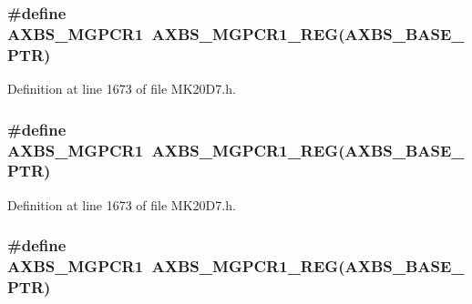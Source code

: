 \subsubsection[{\texorpdfstring{A\+X\+B\+S\+\_\+\+M\+G\+P\+C\+R1}{AXBS_MGPCR1}}]{\setlength{\rightskip}{0pt plus 5cm}\#define A\+X\+B\+S\+\_\+\+M\+G\+P\+C\+R1~{\bf A\+X\+B\+S\+\_\+\+M\+G\+P\+C\+R1\+\_\+\+R\+EG}({\bf A\+X\+B\+S\+\_\+\+B\+A\+S\+E\+\_\+\+P\+TR})}\hypertarget{group___a_x_b_s___register___accessor___macros_ga97c9483a4ad8f53f0c2b52e2e10fcd50}{}\label{group___a_x_b_s___register___accessor___macros_ga97c9483a4ad8f53f0c2b52e2e10fcd50}


Definition at line 1673 of file M\+K20\+D7.\+h.

\subsubsection[{\texorpdfstring{A\+X\+B\+S\+\_\+\+M\+G\+P\+C\+R1}{AXBS_MGPCR1}}]{\setlength{\rightskip}{0pt plus 5cm}\#define A\+X\+B\+S\+\_\+\+M\+G\+P\+C\+R1~{\bf A\+X\+B\+S\+\_\+\+M\+G\+P\+C\+R1\+\_\+\+R\+EG}({\bf A\+X\+B\+S\+\_\+\+B\+A\+S\+E\+\_\+\+P\+TR})}\hypertarget{group___a_x_b_s___register___accessor___macros_ga97c9483a4ad8f53f0c2b52e2e10fcd50}{}\label{group___a_x_b_s___register___accessor___macros_ga97c9483a4ad8f53f0c2b52e2e10fcd50}


Definition at line 1673 of file M\+K20\+D7.\+h.

\subsubsection[{\texorpdfstring{A\+X\+B\+S\+\_\+\+M\+G\+P\+C\+R1}{AXBS_MGPCR1}}]{\setlength{\rightskip}{0pt plus 5cm}\#define A\+X\+B\+S\+\_\+\+M\+G\+P\+C\+R1~{\bf A\+X\+B\+S\+\_\+\+M\+G\+P\+C\+R1\+\_\+\+R\+EG}({\bf A\+X\+B\+S\+\_\+\+B\+A\+S\+E\+\_\+\+P\+TR})}\hypertarget{group___a_x_b_s___register___accessor___macros_ga97c9483a4ad8f53f0c2b52e2e10fcd50}{}\label{group___a_x_b_s___register___accessor___macros_ga97c9483a4ad8f53f0c2b52e2e10fcd50}


